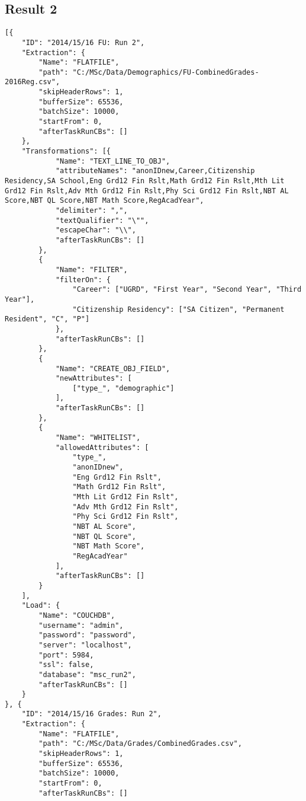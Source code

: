 \subsection{Result 2}
\label{netl-run2-config}
\begin{verbatim}
[{
    "ID": "2014/15/16 FU: Run 2",
    "Extraction": {
        "Name": "FLATFILE",
        "path": "C:/MSc/Data/Demographics/FU-CombinedGrades-2016Reg.csv",
        "skipHeaderRows": 1,
        "bufferSize": 65536,
        "batchSize": 10000,
        "startFrom": 0,
        "afterTaskRunCBs": []
    },
    "Transformations": [{
            "Name": "TEXT_LINE_TO_OBJ",
            "attributeNames": "anonIDnew,Career,Citizenship Residency,SA School,Eng Grd12 Fin Rslt,Math Grd12 Fin Rslt,Mth Lit Grd12 Fin Rslt,Adv Mth Grd12 Fin Rslt,Phy Sci Grd12 Fin Rslt,NBT AL Score,NBT QL Score,NBT Math Score,RegAcadYear",
            "delimiter": ",",
            "textQualifier": "\"",
            "escapeChar": "\\",
            "afterTaskRunCBs": []
        },
        {
            "Name": "FILTER",
            "filterOn": {
                "Career": ["UGRD", "First Year", "Second Year", "Third Year"],
                "Citizenship Residency": ["SA Citizen", "Permanent Resident", "C", "P"]
            },
            "afterTaskRunCBs": []
        },
        {
            "Name": "CREATE_OBJ_FIELD",
            "newAttributes": [
                ["type_", "demographic"]
            ],
            "afterTaskRunCBs": []
        },
        {
            "Name": "WHITELIST",
            "allowedAttributes": [
                "type_",
                "anonIDnew",
                "Eng Grd12 Fin Rslt",
                "Math Grd12 Fin Rslt",
                "Mth Lit Grd12 Fin Rslt",
                "Adv Mth Grd12 Fin Rslt",
                "Phy Sci Grd12 Fin Rslt",
                "NBT AL Score",
                "NBT QL Score",
                "NBT Math Score",
                "RegAcadYear"
            ],
            "afterTaskRunCBs": []
        }
    ],
    "Load": {
        "Name": "COUCHDB",
        "username": "admin",
        "password": "password",
        "server": "localhost",
        "port": 5984,
        "ssl": false,
        "database": "msc_run2",
        "afterTaskRunCBs": []
    }
}, {
    "ID": "2014/15/16 Grades: Run 2",
    "Extraction": {
        "Name": "FLATFILE",
        "path": "C:/MSc/Data/Grades/CombinedGrades.csv",
        "skipHeaderRows": 1,
        "bufferSize": 65536,
        "batchSize": 10000,
        "startFrom": 0,
        "afterTaskRunCBs": []

\end{verbatim}
